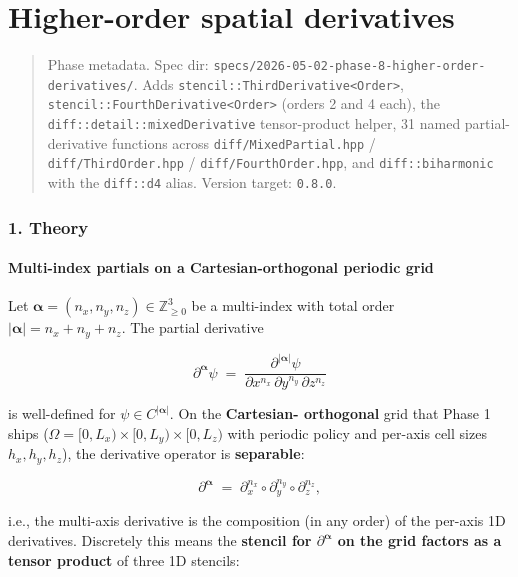 \chapter{Higher-order spatial derivatives}
\label{chap:dev:higher-order-spatial-derivatives}

\begin{quote}
Phase metadata. Spec dir:
\passthrough{\lstinline!specs/2026-05-02-phase-8-higher-order-derivatives/!}.
Adds \passthrough{\lstinline!stencil::ThirdDerivative<Order>!},
\passthrough{\lstinline!stencil::FourthDerivative<Order>!} (orders 2 and
4 each), the \passthrough{\lstinline!diff::detail::mixedDerivative!}
tensor-product helper, 31 named partial-derivative functions across
\passthrough{\lstinline!diff/MixedPartial.hpp!} /
\passthrough{\lstinline!diff/ThirdOrder.hpp!} /
\passthrough{\lstinline!diff/FourthOrder.hpp!}, and
\passthrough{\lstinline!diff::biharmonic!} with the
\passthrough{\lstinline!diff::d4!} alias. Version target:
\passthrough{\lstinline!0.8.0!}.
\end{quote}

\subsection{1. Theory}\label{theory}

\subsubsection{Multi-index partials on a Cartesian-orthogonal periodic
grid}\label{multi-index-partials-on-a-cartesian-orthogonal-periodic-grid}

Let \(\boldsymbol\alpha = (n_x, n_y, n_z) \in \mathbb{Z}_{\geq 0}^3\) be
a multi-index with total order
\(|\boldsymbol\alpha| = n_x + n_y + n_z\). The partial derivative

\[
\partial^{\boldsymbol\alpha}\psi \;=\; \frac{\partial^{|\boldsymbol\alpha|}\psi}{\partial x^{n_x}\,\partial y^{n_y}\,\partial z^{n_z}}
\]

is well-defined for \(\psi \in C^{|\boldsymbol\alpha|}\). On the
\textbf{Cartesian- orthogonal} grid that Phase 1 ships
(\(\Omega = [0,L_x) \times [0,L_y) \times
[0,L_z)\) with periodic policy and per-axis cell sizes
\(h_x, h_y, h_z\)), the derivative operator is \textbf{separable}:

\[
\partial^{\boldsymbol\alpha} \;=\; \partial_x^{n_x}\circ\partial_y^{n_y}\circ\partial_z^{n_z},
\]

i.e., the multi-axis derivative is the composition (in any order) of the
per-axis 1D derivatives. Discretely this means the \textbf{stencil for
\(\partial^{\boldsymbol\alpha}\) on the grid factors as a tensor
product} of three 1D stencils:

